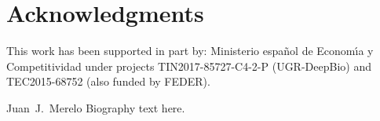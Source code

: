 \documentclass[10pt,journal,compsoc]{IEEEtran}
\begin{document}

\section*{Acknowledgments}

This work has been supported in part by: Ministerio espa\~{n}ol de
Econom\'{\i}a y Competitividad under projects  TIN2017-85727-C4-2-P (UGR-DeepBio) and TEC2015-68752 (also funded by FEDER).






\begin{IEEEbiographynophoto}{Juan~J.~Merelo}
Biography text here.
\end{IEEEbiographynophoto}






\end{document}

